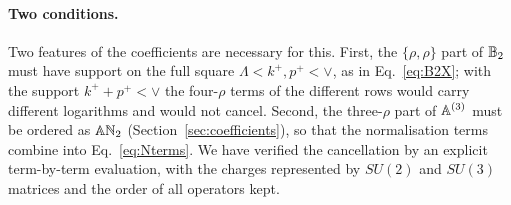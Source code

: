 \paragraph{Two conditions.} Two features of the coefficients are necessary for this. First, the $\{\rho,\rho\}$ part of $\mathbb{B}_2$ must have support on the full square $\Lambda<k^+,p^+<\vee$, as in Eq.~\eqref{eq:B2X}; with the support $k^++p^+<\vee$ the four-$\rho$ terms of the different rows would carry different logarithms and would not cancel. Second, the three-$\rho$ part of $\mathbb{A}^{(3)}$ must be ordered as $\mathbb{A}\mathbb{N}_2$ (Section~\ref{sec:coefficients}), so that the normalisation terms combine into Eq.~\eqref{eq:Nterms}. We have verified the cancellation by an explicit term-by-term evaluation, with the charges represented by $SU(2)$ and $SU(3)$ matrices and the order of all operators kept.

